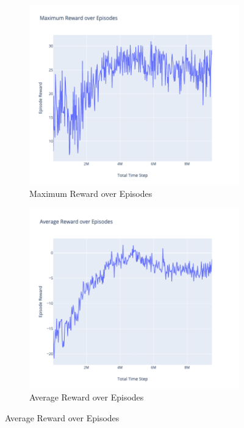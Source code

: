 \begin{figure}[!htb]
	\centering
	\begin{subfigure}[!htb]{0.35\textwidth}
		\centering
		\includegraphics[width=\textwidth]{figures/exps/1st_exp/max_eps_reward}
		\caption{Maximum Reward over Episodes}
		\label{fig:max_eps_reward}
	\end{subfigure}
	\hfill
	\begin{subfigure}[!htb]{0.35\textwidth}
		\centering
		\includegraphics[width=\textwidth]{figures/exps/1st_exp/avg_eps_reward}
		\caption{Average Reward over Episodes}
		\label{fig:avg_eps_reward}
	\end{subfigure}
    \hfill
    

\end{figure}
